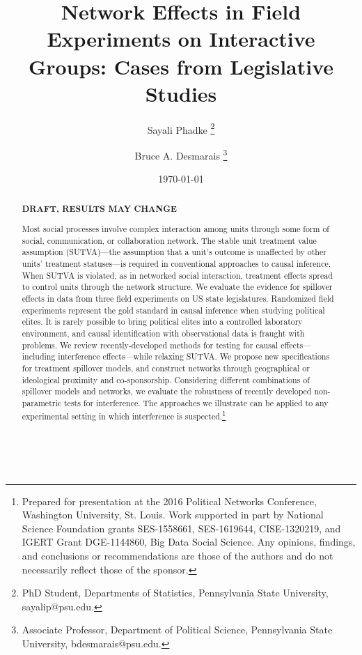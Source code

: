 \documentclass[12pt]{article}
\title{\vspace{-2cm} Network Effects in Field Experiments on Interactive Groups: Cases from Legislative Studies }
\author{Sayali Phadke \thanks{\footnotesize{PhD Student, Departments of Statistics, Pennsylvania State University, sayalip@psu.edu.}} \and Bruce A. Desmarais \thanks{\footnotesize{Associate Professor, Department of Political Science, Pennsylvania State University, bdesmarais@psu.edu.}}} \date{\today}
\begin{document}
\maketitle




\begin{abstract} 
\vspace{.3cm}
\begin{center}
{\bf DRAFT, RESULTS MAY CHANGE}
\end{center}
\vspace{.3cm}

\noindent  Most social processes involve complex interaction among units through some form of social, communication, or collaboration network. The stable unit treatment value assumption (SUTVA)---the assumption that a unit's outcome is unaffected by other units' treatment statuses---is required in conventional approaches to causal inference. When SUTVA is violated, as in networked social interaction, treatment effects spread to control units through the network structure. We evaluate the evidence for spillover effects in data from three field experiments on US state legislatures. Randomized field experiments represent the gold standard in causal inference when studying political elites. It is rarely possible to bring political elites into a controlled laboratory environment, and causal identification with observational data is fraught with problems. We review recently-developed methods for testing for causal effects---including interference effects---while relaxing SUTVA. We propose new specifications for treatment spillover models, and construct networks through geographical or ideological proximity and co-sponsorship. Considering different combinations of spillover models and networks, we evaluate the robustness of recently developed non-parametric tests for interference. The approaches we illustrate can be applied to any experimental setting in which interference is suspected.\footnote{Prepared for presentation at the 2016 Political Networks Conference, Washington University, St. Louis. Work supported in part by National Science Foundation grants SES-1558661, SES-1619644, CISE-1320219, and IGERT Grant DGE-1144860, Big Data Social Science. Any opinions, findings, and conclusions or recommendations are those of the authors and do not necessarily reflect those of the sponsor.} 
\\~\\~\\
\end{abstract}
\end{document}
